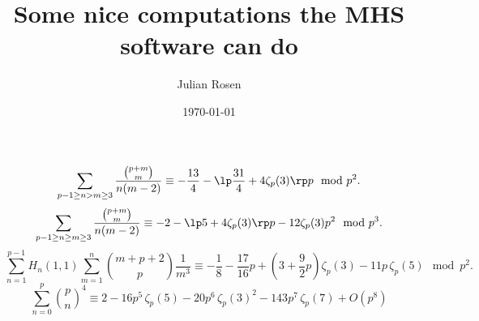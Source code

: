 \documentclass[12pt]{amsart}
\theoremstyle{plain}
\theoremstyle{definition}
\theoremstyle{remark}
\begin{document}
\title{Some nice computations the MHS software can do}
\author{Julian Rosen}
\date{\today}
\maketitle
\[
\sum_{p-1\geq n>m\geq 3}\frac{{p+m\choose m}}{n(m-2)}\equiv -\frac{13}{4}-\lp\frac{31}{4}+4\zeta_p(3)\rp p\mod p^2.
\]
\[
\sum_{p-1\geq n\geq m\geq 3}\frac{{p+m\choose m}}{n(m-2)}\equiv -2-\lp5+4\zeta_p(3)\rp p-12 \zeta_p(3)p^2\mod p^3.
\]
\[
\sum_{n=1}^{p-1}H_n(1,1)\sum_{m=1}^n {m+p+2\choose p}\frac{1}{m^3}\equiv - \frac{1}{8}- \frac{17}{16}p+\left(3+\frac{9}{2}p\right)\zeta_p(3)-11p\,\zeta_p(5)\mod p^2.
\]
\[
\sum_{n=0}^p {p\choose n}^4\equiv 2-16p^{5}\,\zeta_p(5)-20p^{6}\,\zeta_p(3)^{2}-143p^{7}\,\zeta_p(7)+O(p^{8})
\]

%
%
\end{document}
